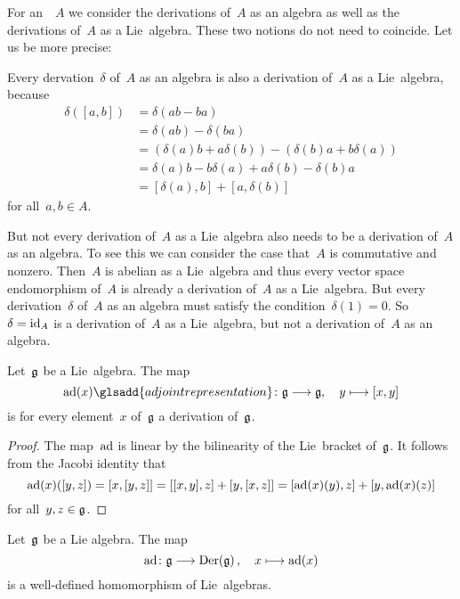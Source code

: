 \begin{remark}
  For an~\algebra{$\kf$}~$A$ we consider the derivations of~$A$ as an algebra as well as the derivations of~$A$ as a Lie~algebra.
  These two notions do not need to coincide.
  Let us be more precise:

  Every dervation~$\delta$ of~$A$ as an algebra is also a derivation of~$A$ as a Lie~algebra, because
  \begin{align*}
    \delta([a,b])
    &=
    \delta(ab - ba)
    \\
    &=
    \delta(ab) - \delta(ba)
    \\
    &=
    ( \delta(a) b + a \delta(b) ) - ( \delta(b) a + b \delta(a) )
    \\
    &=
    \delta(a) b - b \delta(a) + a \delta(b) - \delta(b) a
    \\
    &=
    [\delta(a), b] + [a, \delta(b)]
  \end{align*}
  for all~$a, b \in A$.

  But not every derivation of~$A$ as a Lie~algebra also needs to be a derivation of~$A$ as an algebra.
  To see this we can consider the case that~$A$ is commutative and nonzero.
  Then~$A$ is abelian as a Lie~algebra and thus every vector space endomorphism of~$A$ is already a derivation of~$A$ as a Lie~algebra.
  But every derivation~$\delta$ of~$A$ as an algebra must satisfy the condition~$\delta(1) = 0$.
  So~$\delta = \mathrm{id}_A$ is a derivation of~$A$ as a Lie~algebra, but not a derivation of~$A$ as an algebra.
\end{remark}


\begin{proposition}
  \label{lie algebras act adjoint by derivations}
  Let~$\mathfrak{g}$ be a Lie~algebra.
  The map
  \[
    \ad(x)\glsadd{adjoint representation}
    \colon
    \glie
    \to
    \glie,
    \quad
    y
    \mapsto
    [x,y]
  \]
  is for every element~$x$ of~$\mathfrak{g}$ a derivation of~$\mathfrak{g}$.
\end{proposition}


\begin{proof}
  The map~$\operatorname{ad}$ is linear by the bilinearity of the Lie~bracket of~$\mathfrak{g}$.
  It follows from the Jacobi identity that
  \[
    \operatorname{ad}(x)([y,z])
    =
    [x,[y,z]]
    =
    [[x,y],z] + [y,[x,z]] \\
    =
    [\operatorname{ad}(x)(y), z] + [y, \operatorname{ad}(x)(z)]
  \]
  for all~$y,z \in \mathfrak{g}$.
\end{proof}


\begin{corollary}
  Let~$\mathfrak{g}$ be a Lie algebra.
  The map
  \[
    \ad
    \colon
    \glie
    \to
    \Der(\glie) \,,
    \quad
    x
    \mapsto
    \ad(x)
  \]
  is a well-defined homomorphism of Lie~algebras.
\end{corollary}


